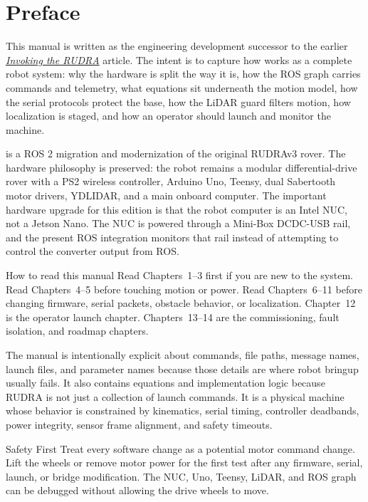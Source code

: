 \chapter*{Preface}

This manual is written as the engineering development successor to the earlier \emph{\href{https://adarsh-gouda.medium.com/rudra-8e643e279d95?postPublishedType=repub}{Invoking the RUDRA}} article. The intent is to capture how \RUDRAv{} works as a complete robot system: why the hardware is split the way it is, how the ROS graph carries commands and telemetry, what equations sit underneath the motion model, how the serial protocols protect the base, how the LiDAR guard filters motion, how localization is staged, and how an operator should launch and monitor the machine.

\RUDRAv{} is a ROS 2 migration and modernization of the original RUDRAv3 rover. The hardware philosophy is preserved: the robot remains a modular differential-drive rover with a PS2 wireless controller, Arduino Uno, Teensy, dual Sabertooth motor drivers, YDLIDAR, and a main onboard computer. The important hardware upgrade for this edition is that the robot computer is an Intel NUC, not a Jetson Nano. The NUC is powered through a Mini-Box DCDC-USB rail, and the present ROS integration monitors that rail instead of attempting to control the converter output from ROS.

\begin{designbox}{How to read this manual}
Read Chapters~1--3 first if you are new to the system. Read Chapters~4--5 before touching motion or power. Read Chapters~6--11 before changing firmware, serial packets, obstacle behavior, or localization. Chapter~12 is the operator launch chapter. Chapters~13--14 are the commissioning, fault isolation, and roadmap chapters.
\end{designbox}

The manual is intentionally explicit about commands, file paths, message names, launch files, and parameter names because those details are where robot bringup usually fails. It also contains equations and implementation logic because RUDRA is not just a collection of launch commands. It is a physical machine whose behavior is constrained by kinematics, serial timing, controller deadbands, power integrity, sensor frame alignment, and safety timeouts.

\begin{safetybox}{Safety First}
Treat every software change as a potential motor command change. Lift the wheels or remove motor power for the first test after any firmware, serial, launch, or bridge modification. The NUC, Uno, Teensy, LiDAR, and ROS graph can be debugged without allowing the drive wheels to move.
\end{safetybox}

